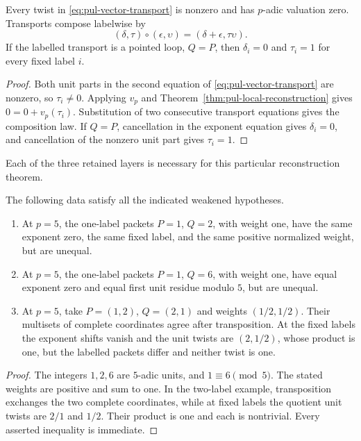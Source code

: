 \begin{proposition}
\label{prop:pul-vector-holonomy}
Every twist in \eqref{eq:pul-vector-transport} is nonzero and has
$p$-adic valuation zero.  Transports compose labelwise by
\[
       (\delta,\tau)\circ(\epsilon,\upsilon)
       =(\delta+\epsilon,\tau\upsilon).
\]
If the labelled transport is a pointed loop, $Q=P$, then
$\delta_i=0$ and $\tau_i=1$ for every fixed label $i$.
\end{proposition}

\begin{proof}
Both unit parts in the second equation of
\eqref{eq:pul-vector-transport} are nonzero, so $\tau_i\ne0$.  Applying
$v_p$ and Theorem~\ref{thm:pul-local-reconstruction} gives
$0=0+v_p(\tau_i)$.  Substitution of two consecutive transport equations
gives the composition law.  If $Q=P$, cancellation in the exponent equation
gives $\delta_i=0$, and cancellation of the nonzero unit part gives
$\tau_i=1$.
\end{proof}

Each of the three retained layers is necessary for this particular
reconstruction theorem.

\begin{proposition}
\label{prop:pul-three-counterexamples}
The following data satisfy all the indicated weakened hypotheses.
\begin{enumerate}
\item At $p=5$, the one-label packets $P=1$, $Q=2$, with weight one,
have the same exponent zero, the same fixed label, and the same positive
normalized weight, but are unequal.
\item At $p=5$, the one-label packets $P=1$, $Q=6$, with weight one,
have equal exponent zero and equal first unit residue modulo $5$, but are
unequal.
\item At $p=5$, take $P=(1,2)$, $Q=(2,1)$ and weights $(1/2,1/2)$.
Their multisets of complete coordinates agree after transposition.  At the
fixed labels the exponent shifts vanish and the unit twists are $(2,1/2)$,
whose product is one, but the labelled packets differ and neither twist is
one.
\end{enumerate}
\end{proposition}

\begin{proof}
The integers $1,2,6$ are $5$-adic units, and $1\equiv6\pmod5$.
The stated weights are positive and sum to one.  In the two-label example,
transposition exchanges the two complete coordinates, while at fixed labels
the quotient unit twists are $2/1$ and $1/2$.  Their product is one and each
is nontrivial.  Every asserted inequality is immediate.
\end{proof}

